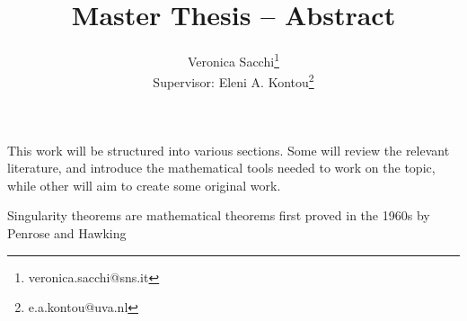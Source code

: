 \documentclass[12pt, a4paper]{article}
\title{Master Thesis -- Abstract}
\author{Veronica Sacchi\thanks{veronica.sacchi@sns.it}\\
Supervisor: Eleni A. Kontou\thanks{e.a.kontou@uva.nl}}
\begin{document}
\maketitle

This work will be structured into various sections. Some will review the relevant literature, and introduce the mathematical tools needed to work on the topic, while other will aim to create some original work.


Singularity theorems are mathematical theorems first proved in the 1960s by Penrose and Hawking
\clearpage
\end{document}
